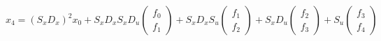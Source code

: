 \documentclass[10pt,a4paper]{article}
\begin{document}
\begin{equation}
x_4=
(S_xD_x)^2x_0+
S_xD_xS_xD_u\begin{pmatrix} f_0 \\ f_1 \end{pmatrix}+
S_xD_xS_u\begin{pmatrix} f_1 \\ f_2 \end{pmatrix}+
S_xD_u\begin{pmatrix} f_2 \\ f_3 \end{pmatrix}+
S_u\begin{pmatrix} f_3 \\ f_4 \end{pmatrix}
\end{equation}
\begin{comment}

\begin{equation}
x_5=
(D_xS_xD_xS_x)D_xx_0+
(D_xS_xD_xS_x)D_u\begin{pmatrix} f_0 \\ f_1 \end{pmatrix}+
(D_xS_x)D_xS_u\begin{pmatrix} f_1 \\ f_2 \end{pmatrix}+
(D_xS_x)D_u\begin{pmatrix} f_2 \\ f_3 \end{pmatrix}+
D_xS_u\begin{pmatrix} f_3 \\ f_4 \end{pmatrix}+
D_u\begin{pmatrix} f_4 \\ f_5 \end{pmatrix}
\end{equation}

\begin{equation}
x_6=
(S_xD_x)^3x_0+
(S_xD_x)^2S_xD_u\begin{pmatrix} f_0 \\ f_1 \end{pmatrix}+
(S_xD_x)^2S_u\begin{pmatrix} f_1 \\ f_2 \end{pmatrix}+
S_xD_xS_xD_u\begin{pmatrix} f_2 \\ f_3 \end{pmatrix}+
S_xD_xS_u\begin{pmatrix} f_3 \\ f_4 \end{pmatrix}+
S_xD_u\begin{pmatrix} f_4 \\ f_5 \end{pmatrix}
S_u\begin{pmatrix} f_5 \\ f_6 \end{pmatrix}
\end{equation}
\end{comment}
\end{document}

